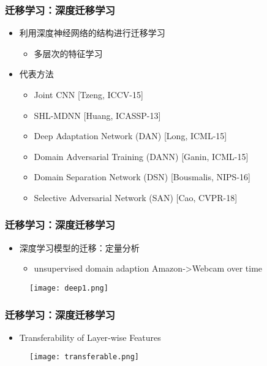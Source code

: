 
\begin{frame}
    \frametitle{迁移学习：深度迁移学习}
    \begin{itemize}
        \item 利用深度神经网络的结构进行迁移学习
            \begin{itemize}
                \item 多层次的特征学习
            \end{itemize}
        \item 代表方法
            \begin{itemize}
                \item Joint CNN [Tzeng, ICCV-15]
                \item SHL-MDNN [Huang, ICASSP-13]
                \item Deep Adaptation Network (DAN) [Long, ICML-15]
                \item Domain Adversarial Training (DANN) [Ganin, ICML-15]
                \item Domain Separation Network (DSN) [Bousmalis, NIPS-16]
                \item Selective Adversarial Network (SAN) [Cao, CVPR-18]
            \end{itemize}
    \end{itemize}
\end{frame}

\begin{frame}
    \frametitle{迁移学习：深度迁移学习}
    \begin{itemize}
        \item 深度学习模型的迁移：定量分析
            \begin{itemize}
                \item unsupervised domain adaption Amazon‑>Webcam over time
            \end{itemize}
    \end{itemize}
    \begin{figure}
        \texttt{[image: deep1.png]}
    \end{figure}
\end{frame}

\begin{frame}
    \frametitle{迁移学习：深度迁移学习}
    \begin{itemize}
        \item Transferability of Layer‑wise Features 
    \end{itemize}
    \begin{figure}
        \texttt{[image: transferable.png]}
    \end{figure}
\end{frame}

